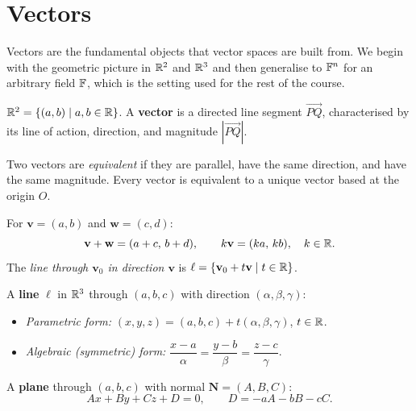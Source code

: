 \section{Vectors}

Vectors are the fundamental objects that vector spaces are built from.  We
begin with the geometric picture in $\mathbb{R}^2$ and $\mathbb{R}^3$ and then generalise to
$\mathbb{F}^n$ for an arbitrary field $\mathbb{F}$, which is the setting used for the rest of
the course.

\begin{defbox}
$\mathbb{R}^2 = \{(a,b)\mid a,b\in\mathbb{R}\}$.  A \textbf{vector} is a directed line
segment $\overrightarrow{PQ}$, characterised by its line of action, direction,
and magnitude $|\overrightarrow{PQ}|$.

Two vectors are \emph{equivalent} if they are parallel, have the same
direction, and have the same magnitude.  Every vector is equivalent to a
unique vector based at the origin $O$.

\medskip
For $\mathbf{v}=(a,b)$ and $\mathbf{w}=(c,d)$:
\[
    \mathbf{v}+\mathbf{w} = (a+c,\,b+d), \qquad k\mathbf{v} = (ka,\,kb),
    \quad k\in\mathbb{R}.
\]
The \emph{line through $\mathbf{v}_0$ in direction $\mathbf{v}$} is
$\ell = \{\mathbf{v}_0 + t\mathbf{v}\mid t\in\mathbb{R}\}$.
\end{defbox}

\begin{defbox}
A \textbf{line} $\ell$ in $\mathbb{R}^3$ through $(a,b,c)$ with direction
$(\alpha,\beta,\gamma)$:
\begin{itemize}
    \item \emph{Parametric form:}
          $(x,y,z) = (a,b,c) + t(\alpha,\beta,\gamma)$, $t\in\mathbb{R}$.
    \item \emph{Algebraic (symmetric) form:}
          $\dfrac{x-a}{\alpha} = \dfrac{y-b}{\beta} = \dfrac{z-c}{\gamma}$.
\end{itemize}

A \textbf{plane} through $(a,b,c)$ with normal $\mathbf{N}=(A,B,C)$:
\[
    Ax + By + Cz + D = 0, \qquad D = -aA-bB-cC.
\]
\end{defbox}


